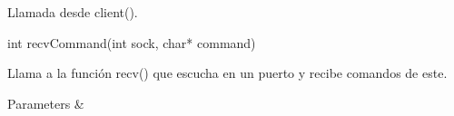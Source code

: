 Llamada desde client().


\begin{DoxyCode}
\textcolor{keywordtype}{int} recvCommand(\textcolor{keywordtype}{int} sock, \textcolor{keywordtype}{char}* command)
\end{DoxyCode}


Llama a la función recv() que escucha en un puerto y recibe comandos de este.


\begin{DoxyParams}{Parameters}
{\em } & \\
\hline
\end{DoxyParams}

